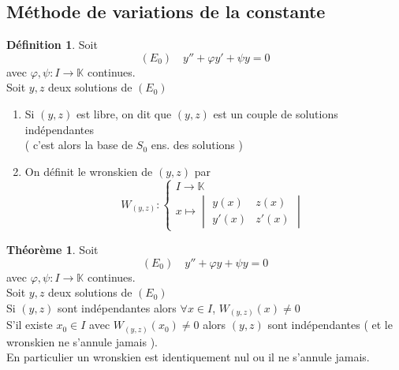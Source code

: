 \documentclass[10pt,a4paper]{article}
\theoremstyle{definition}
\newtheorem{theorem}[proposition]{Théorème}
\newtheorem{definition}[proposition]{Définition}
\begin{document}
\subsection{Méthode de variations de la constante}
\begin{definition}
    Soit 
    \[(E_0) \quad y'' + \varphi y' + \psi y = 0\]
    avec \(\varphi, \psi: I \to \mathbb{K}\) continues. \\
    Soit \(y, z\) deux solutions de \((E_0)\)
    \begin{enumerate}
        \item Si \((y, z)\) est libre, on dit que \((y, z)\) est un couple de solutions indépendantes \\
        ( c'est alors la base de \(S_0\) ens. des solutions )
        \item On définit le wronskien de \((y, z)\) par
        \[W_{(y, z)}: \begin{cases}
            I \to \mathbb{K} \\
            x \mapsto \begin{vmatrix}
                y(x) & z(x) \\
                y'(x) & z'(x)
            \end{vmatrix}
        \end{cases}\]
    \end{enumerate}
\end{definition}
\begin{theorem}
    Soit 
    \[(E_0) \quad y'' + \varphi y + \psi y = 0\]
    avec \(\varphi, \psi: I \to \mathbb{K}\) continues. \\
    Soit \(y, z\) deux solutions de \((E_0)\) \\
    Si \((y, z)\) sont indépendantes alors \(\forall x \in I\), \(W_{(y, z)}(x) \neq 0\) \\
    S'il existe \(x_0 \in I\) avec \(W_{(y, z)}(x_0) \neq 0\) alors \((y, z)\) sont indépendantes ( et le wronskien ne s'annule jamais ). \\
    En particulier un wronskien est identiquement nul ou il ne s'annule jamais.
\end{theorem}
\end{document}
